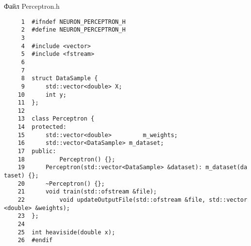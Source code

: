 Файл Perceptron.h
\begin{verbatim}
     1  #ifndef NEURON_PERCEPTRON_H
     2  #define NEURON_PERCEPTRON_H
     3
     4  #include <vector>
     5  #include <fstream>
     6
     7
     8  struct DataSample {
     9      std::vector<double> X;
    10      int y;
    11  };
    12
    13  class Perceptron {
    14  protected:
    15      std::vector<double>         m_weights;
    16      std::vector<DataSample> m_dataset;
    17  public:
    18          Perceptron() {};
    19      Perceptron(std::vector<DataSample> &dataset): m_dataset(da
taset) {};
    20      ~Perceptron() {};
    21      void train(std::ofstream &file);
    22          void updateOutputFile(std::ofstream &file, std::vector
<double> &weights);
    23  };
    24
    25  int heaviside(double x);
    26  #endif
\end{verbatim}

